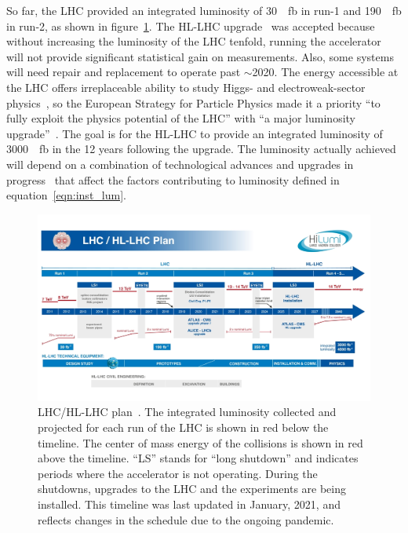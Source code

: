 So far, the LHC provided an integrated luminosity of \SI{30}{\per\femto\barn} in run-1 and \SI{190}{\per\femto\barn} in run-2, as shown in figure~\ref{fig:hl-lhc}. The HL-LHC upgrade~\cite{hl_lhc_tdr} was accepted because without increasing the luminosity of the LHC tenfold, running the accelerator will not provide significant statistical gain on measurements. Also, some systems will need repair and replacement to operate past $\sim$2020. The energy accessible at the LHC offers irreplaceable ability to study Higgs- and electroweak-sector physics~\cite{dainese_physics_2018}, so the European Strategy for Particle Physics made it a priority ``to fully exploit the physics potential of the LHC'' with ``a major luminosity upgrade''~\cite{european_strategy_for_particle_physics}. The goal is for the HL-LHC to provide an integrated luminosity of \SI{3000}{\per\femto\barn} in the 12 years following the upgrade. The luminosity actually achieved will depend on a combination of technological advances and upgrades in progress~\cite{hl_lhc_tdr} that affect the factors contributing to luminosity defined in equation~\ref{eqn:inst_lum}.


\begin{figure}
    \centering
    \includegraphics[width = \textwidth]{figures/HL-LHC-updated-January-2021_small.jpg}
    \caption{LHC/HL-LHC plan~\cite{hl-lhc_plan_picture_website}. The integrated luminosity collected and projected for each run of the LHC is shown in red below the timeline. The center of mass energy of the collisions is shown in red above the timeline. ``LS'' stands for ``long shutdown'' and indicates periods where the accelerator is not operating. During the shutdowns, upgrades to the LHC and the experiments are being installed. This timeline was last updated in January, 2021, and reflects changes in the schedule due to the ongoing pandemic. }
    \label{fig:hl-lhc}
\end{figure}

